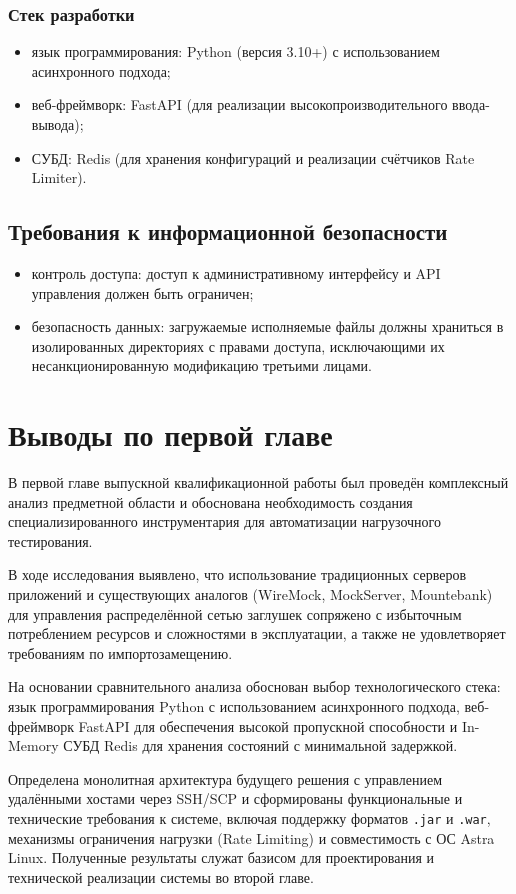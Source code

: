 \subsubsection {Стек разработки}

\begin{itemize}
\item язык программирования: Python (версия 3.10+) с использованием асинхронного подхода;
\item веб-фреймворк: FastAPI (для реализации высокопроизводительного ввода-вывода);
\item СУБД: Redis (для хранения конфигураций и реализации счётчиков Rate Limiter).
\end{itemize}

\subsection{Требования к информационной безопасности}

\begin{itemize}
\item контроль доступа: доступ к административному интерфейсу и API управления должен быть ограничен;
\item безопасность данных: загружаемые исполняемые файлы должны храниться в изолированных директориях с правами доступа, исключающими их несанкционированную модификацию третьими лицами.
\end{itemize}

\section {Выводы по первой главе}

В первой главе выпускной квалификационной работы был проведён комплексный анализ предметной области и обоснована необходимость создания специализированного инструментария для автоматизации нагрузочного тестирования.

В ходе исследования выявлено, что использование традиционных серверов приложений и существующих аналогов (WireMock, MockServer, Mountebank) для управления распределённой сетью заглушек сопряжено с избыточным потреблением ресурсов и сложностями в эксплуатации, а также не удовлетворяет требованиям по импортозамещению.

На основании сравнительного анализа обоснован выбор технологического стека: язык программирования Python с использованием асинхронного подхода, веб-фреймворк FastAPI для обеспечения высокой пропускной способности и In-Memory СУБД Redis для хранения состояний с минимальной задержкой.

Определена монолитная архитектура будущего решения с управлением удалёнными хостами через SSH/SCP и сформированы функциональные и технические требования к системе, включая поддержку форматов \texttt{.jar} и \texttt{.war}, механизмы ограничения нагрузки (Rate Limiting) и совместимость с ОС Astra Linux. Полученные результаты служат базисом для проектирования и технической реализации системы во второй главе.